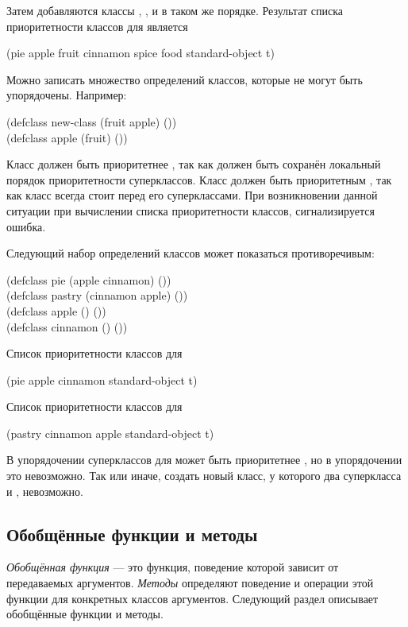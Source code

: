 Затем добавляются классы , ,  и
 в таком же порядке. Результат списка приоритетности классов для
 является
\begin{lisp}
(pie apple fruit cinnamon spice food standard-object t)
\end{lisp}

Можно записать множество определений классов, которые не могут быть
упорядочены. Например:
\begin{lisp}
(defclass new-class (fruit apple) ()) \\
(defclass apple (fruit) ())
\end{lisp}

Класс  должен быть приоритетнее , так как должен быть
сохранён локальный порядок приоритетности суперклассов. Класс 
должен быть приоритетным , так как класс всегда стоит перед его
суперклассами. При возникновении данной ситуации при вычислении списка
приоритетности классов, сигнализируется ошибка.

Следующий набор определений классов может показаться противоречивым:
\begin{lisp}
(defclass pie (apple cinnamon) ()) \\
(defclass pastry (cinnamon apple) ()) \\
(defclass apple () ()) \\
(defclass cinnamon () ())
\end{lisp}

Список приоритетности классов для 
\begin{lisp}
(pie apple cinnamon standard-object t)
\end{lisp}

Список приоритетности классов для 
\begin{lisp}
(pastry cinnamon apple standard-object t)
\end{lisp}

В упорядочении суперклассов для   может быть приоритетнее
, но в упорядочении  это невозможно. Так или
иначе, создать новый класс, у которого два суперкласса  и ,
невозможно.

\subsection{Обобщённые функции и методы}

\emph{Обобщённая функция} --- это функция, поведение которой зависит от
передаваемых аргументов. \emph{Методы} определяют поведение и операции этой функции для
конкретных классов аргументов. Следующий раздел описывает обобщённые функции и методы.

